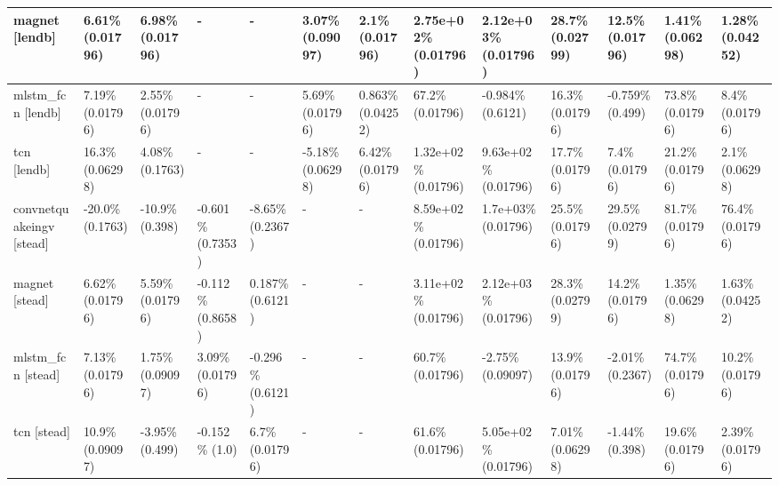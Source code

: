 \begin{table}[]
\begin{adjustwidth}{-1in}{-1in}
\begin{tabular}{|l|l|l|l|l|l|l|l|l|l|l|l|l|}
magnet [lendb] & \cellcolor{green} 6.61\% (0.01796) & \cellcolor{green} 6.98\% (0.01796) & - & - & 3.07\% (0.09097) & \cellcolor{green} 2.1\% (0.01796) & \cellcolor{green} 2.75e+02\% (0.01796) & \cellcolor{green} 2.12e+03\% (0.01796) & \cellcolor{green} 28.7\% (0.02799) & \cellcolor{green} 12.5\% (0.01796) & 1.41\% (0.06298) & \cellcolor{green} 1.28\% (0.04252) \\ \hline
mlstm\_fcn [lendb] & \cellcolor{green} 7.19\% (0.01796) & \cellcolor{green} 2.55\% (0.01796) & - & - & \cellcolor{green} 5.69\% (0.01796) & \cellcolor{green} 0.863\% (0.04252) & \cellcolor{green} 67.2\% (0.01796) & -0.984\% (0.6121) & \cellcolor{green} 16.3\% (0.01796) & -0.759\% (0.499) & \cellcolor{green} 73.8\% (0.01796) & \cellcolor{green} 8.4\% (0.01796) \\ \hline
tcn [lendb] & 16.3\% (0.06298) & 4.08\% (0.1763) & - & - & -5.18\% (0.06298) & \cellcolor{green} 6.42\% (0.01796) & \cellcolor{green} 1.32e+02\% (0.01796) & \cellcolor{green} 9.63e+02\% (0.01796) & \cellcolor{green} 17.7\% (0.01796) & \cellcolor{green} 7.4\% (0.01796) & \cellcolor{green} 21.2\% (0.01796) & 2.1\% (0.06298) \\ \hline
convnetquakeingv [stead] & -20.0\% (0.1763) & -10.9\% (0.398) & -0.601\% (0.7353) & -8.65\% (0.2367) & - & - & \cellcolor{green} 8.59e+02\% (0.01796) & \cellcolor{green} 1.7e+03\% (0.01796) & \cellcolor{green} 25.5\% (0.01796) & \cellcolor{green} 29.5\% (0.02799) & \cellcolor{green} 81.7\% (0.01796) & \cellcolor{green} 76.4\% (0.01796) \\ \hline
magnet [stead] & \cellcolor{green} 6.62\% (0.01796) & \cellcolor{green} 5.59\% (0.01796) & -0.112\% (0.8658) & 0.187\% (0.6121) & - & - & \cellcolor{green} 3.11e+02\% (0.01796) & \cellcolor{green} 2.12e+03\% (0.01796) & \cellcolor{green} 28.3\% (0.02799) & \cellcolor{green} 14.2\% (0.01796) & 1.35\% (0.06298) & \cellcolor{green} 1.63\% (0.04252) \\ \hline
mlstm\_fcn [stead] & \cellcolor{green} 7.13\% (0.01796) & 1.75\% (0.09097) & \cellcolor{green} 3.09\% (0.01796) & -0.296\% (0.6121) & - & - & \cellcolor{green} 60.7\% (0.01796) & -2.75\% (0.09097) & \cellcolor{green} 13.9\% (0.01796) & -2.01\% (0.2367) & \cellcolor{green} 74.7\% (0.01796) & \cellcolor{green} 10.2\% (0.01796) \\ \hline
tcn [stead] & 10.9\% (0.09097) & -3.95\% (0.499) & -0.152\% (1.0) & \cellcolor{green} 6.7\% (0.01796) & - & - & \cellcolor{green} 61.6\% (0.01796) & \cellcolor{green} 5.05e+02\% (0.01796) & 7.01\% (0.06298) & -1.44\% (0.398) & \cellcolor{green} 19.6\% (0.01796) & \cellcolor{green} 2.39\% (0.01796) \\ \hline

\end{tabular}
\end{adjustwidth}
\end{table}
